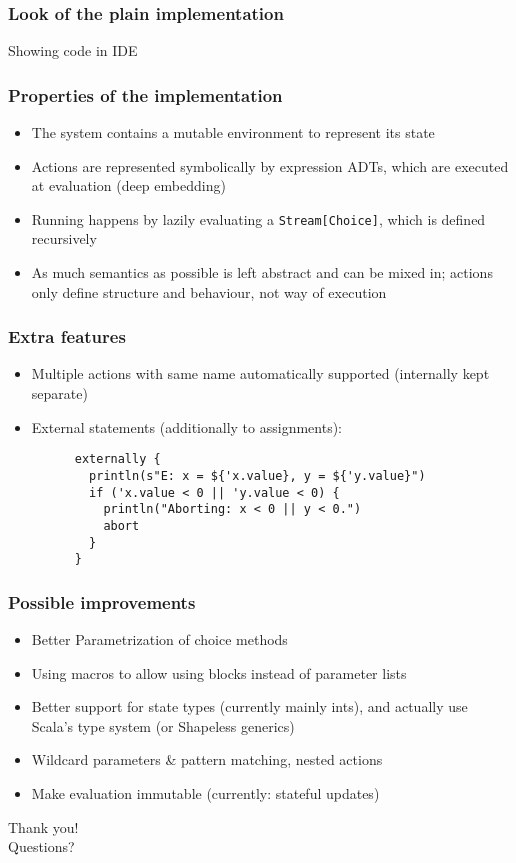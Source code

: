 \documentclass{beamer}
\begin{document}
\begin{frame}
  \frametitle{Look of the plain implementation}
  \centering\Huge
  \textcolor{textgreen}{Showing code in IDE}
\end{frame}



\begin{frame}
  \frametitle{Properties of the implementation}
  \begin{itemize}
  \item The system contains a mutable environment to represent its state
  \item Actions are represented symbolically by expression ADTs, which are executed at evaluation
    (deep embedding)
  \item Running happens by lazily evaluating a \lstinline|Stream[Choice]|, which is defined
    recursively
  \item As much semantics as possible is left abstract and can be mixed in; actions only define
    structure and behaviour, not way of execution
  \end{itemize}
\end{frame}

\begin{frame}[containsverbatim]
  \lstset{gobble=6,deletestring=[b]'}
  \frametitle{Extra features}
  \begin{itemize}
  \item Multiple actions with same name automatically supported (internally kept separate)
  \item External statements (additionally to assignments):
    \begin{lstlisting}
      externally {
        println(s"E: x = ${'x.value}, y = ${'y.value}")
        if ('x.value < 0 || 'y.value < 0) {
          println("Aborting: x < 0 || y < 0.")
          abort
        }
      }
    \end{lstlisting}
  \end{itemize}
\end{frame}

\begin{frame}
  \frametitle{Possible improvements}
  \begin{itemize}
  \item Better Parametrization of choice methods
  \item Using macros to allow using blocks instead of parameter lists
  \item Better support for state types (currently mainly ints), and actually use Scala's type
    system (or Shapeless generics)
  \item Wildcard parameters \& pattern matching, nested actions
  \item Make evaluation immutable (currently: stateful updates)
  \end{itemize}
\end{frame}

\begin{frame}
  \centering\Huge
  \textcolor{textgreen}{Thank you!\\[1em] Questions?}
\end{frame}
\end{document}
